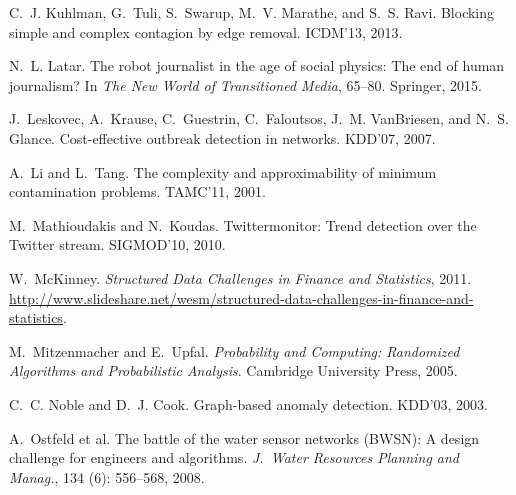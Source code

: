 \begin{thebibliography}{41}
C.~J. Kuhlman, G.~Tuli, S.~Swarup, M.~V. Marathe, and S.~S. Ravi.
\newblock Blocking simple and complex contagion by edge removal.
\newblock ICDM'13, 2013.

N.~L. Latar.
\newblock The robot journalist in the age of social physics: The end of human
  journalism?
\newblock In \emph{The New World of Transitioned Media}, 65--80.
  Springer, 2015.

J.~Leskovec, A.~Krause, C.~Guestrin, C.~Faloutsos, J.~M. VanBriesen, and N.~S.
  Glance.
\newblock Cost-effective outbreak detection in networks.
\newblock KDD'07, 2007.

A.~Li and L.~Tang.
\newblock The complexity and approximability of minimum contamination problems.
\newblock TAMC'11, 2001.

M.~Mathioudakis and N.~Koudas.
\newblock Twittermonitor: Trend detection over the {T}witter stream.
\newblock SIGMOD'10, 2010.

W.~McKinney.
\newblock \emph{Structured Data Challenges in Finance and Statistics}, 2011.
\newblock
  \url{http://www.slideshare.net/wesm/structured-data-challenges-in-finance-and-statistics}.

M.~Mitzenmacher and E.~Upfal.
\newblock \emph{Probability and Computing: Randomized Algorithms and
  Probabilistic Analysis}.
\newblock Cambridge University Press, 2005.

C.~C. Noble and D.~J. Cook.
\newblock Graph-based anomaly detection.
\newblock KDD'03, 2003.

A.~Ostfeld et al.
\newblock The battle of the water sensor networks ({BWSN}): A design challenge
  for engineers and algorithms.
\newblock \emph{J.~Water Resources Planning and Manag.},
  134 (6): 556--568, 2008.


\end{thebibliography}
